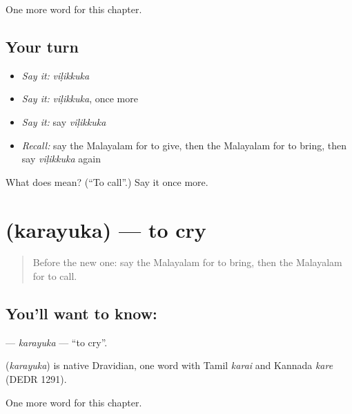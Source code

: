 \begin{grammarlens}[title={What you've built}]
One more word for this chapter.
\end{grammarlens}

\subsection*{Your turn}
\begin{itemize}
\raggedright
  \item \emph{Say it:} \emph{viḷikkuka}
  \item \emph{Say it:} \emph{viḷikkuka}, once more
  \item \emph{Say it:} say \emph{viḷikkuka}
  \item \emph{Recall:} say the Malayalam for to give, then the Malayalam for to bring, then say \emph{viḷikkuka} again
\end{itemize}

\begin{tcolorbox}[breakable,colback=teal!4,colframe=teal!35!black,title={Before you move on}]
What does  mean? (\textquotedblleft{}To call\textquotedblright{}.) Say it once more.
\end{tcolorbox}
\section[\texorpdfstring{\ml{കരയുക} (karayuka)}{കരയുക (karayuka)}]{ (karayuka) — to cry}

\label{lesson:ML-C172-karayuka}



\begin{quote}
Before the new one: say the Malayalam for to bring, then the Malayalam for to call.
\end{quote}

\subsection*{You'll want to know: }
\textbf{} — \emph{karayuka} — \textquotedblleft{}to cry\textquotedblright{}.

\begin{cousinweb}
\textbf{} (\emph{karayuka}) is native Dravidian, one word with Tamil \emph{karai} and Kannada \emph{kare} (DEDR 1291).
\end{cousinweb}

\begin{grammarlens}[title={What you've built}]
One more word for this chapter.
\end{grammarlens}

